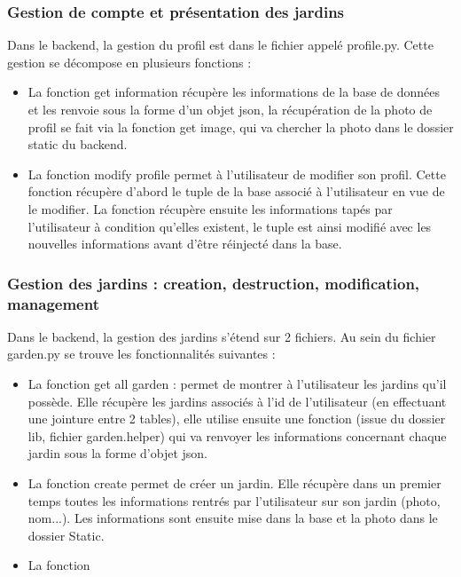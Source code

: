 \documentclass[french,a4paper]{article}
\begin{document}
\subsubsection{Gestion de compte et présentation des jardins}
Dans le backend, la gestion du profil est dans le fichier appelé profile.py. Cette gestion se décompose en plusieurs fonctions :
\begin{itemize}
    \item La fonction get information récupère les informations de la base de données et les renvoie sous la forme d'un objet json, 
la récupération de la photo de profil se fait via la fonction get image, qui va chercher la photo dans le dossier static du backend.
    \item La fonction modify profile permet à l'utilisateur de modifier son profil. Cette fonction récupère d'abord le tuple de la base 
associé à l'utilisateur en vue de le modifier. La fonction récupère ensuite les informations tapés par l'utilisateur à condition qu'elles 
existent, le tuple est ainsi modifié avec les nouvelles informations avant d'être réinjecté dans la base.
\end{itemize}
\subsubsection{Gestion des jardins : creation, destruction, modification, management}
Dans le backend, la gestion des jardins s'étend sur 2 fichiers. Au sein du fichier garden.py se trouve les fonctionnalités suivantes : 
\begin{itemize}
    \item La fonction get all garden : permet de montrer à l'utilisateur les jardins qu'il possède. Elle récupère les jardins associés
à l'id de l'utilisateur (en effectuant une jointure entre 2 tables), elle utilise ensuite une fonction (issue du dossier lib, fichier
garden.helper) qui va renvoyer les informations concernant chaque jardin sous la forme d'objet json. 
    \item La fonction create permet de créer un jardin. Elle récupère dans un premier temps toutes les informations rentrés par 
l'utilisateur sur son jardin (photo, nom...). Les informations sont ensuite mise dans la base et la photo dans le dossier Static.
    \item La fonction 

\end{itemize} 
\subsection{}
\end{document}
